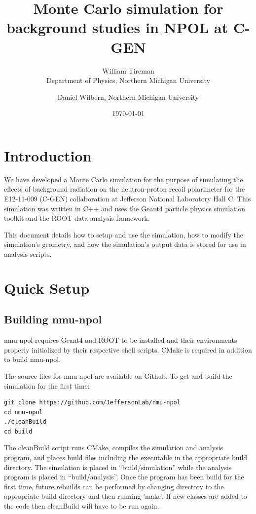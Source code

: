 \documentclass[10pt,titlepage]{article}
\title{Monte Carlo simulation for background studies in NPOL at C-GEN}
\date{\today}
\author{William Tireman\\ Department of Physics, Northern Michigan University \and Daniel Wilbern, Northern Michigan University}
\begin{document}
\maketitle

\section{Introduction}
We have developed a Monte Carlo simulation for the purpose of simulating the effects of background radiation on the neutron-proton recoil polarimeter for the E12-11-009 (C-GEN) collaboration at Jefferson National Laboratory Hall C.  This simulation was written in C++ and uses the Geant4 particle physics simulation toolkit and the ROOT data analysis framework.

This document details how to setup and use the simulation, how to modify the simulation's geometry, and how the simulation's output data is stored for use in analysis scripts.

\section{Quick Setup}

\subsection{Building nmu-npol}

nmu-npol requires Geant4 and ROOT to be installed and their environments properly initialized by their respective shell scripts.  CMake is required in addition to build nmu-npol.

The source files for nmu-npol are available on Github.  To get and build the simulation for the first time:
\begin{lstlisting}[frame=single]
git clone https://github.com/JeffersonLab/nmu-npol
cd nmu-npol
./cleanBuild
cd build
\end{lstlisting}

The cleanBuild script runs CMake, compiles the simulation and analysis program, and places build files including the executable in the appropriate build directory.  The simulation is placed in ``build/simulation'' while the analysis program is placed in ``build/analysis''. Once the program has been build for the first time, future rebuilds can be performed by changing directory to the appropriate build directory and then running 'make'.  If new classes are added to the code then cleanBuild will have to be run again.
\end{document}
